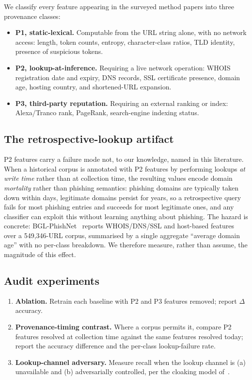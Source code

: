 \documentclass[conference]{IEEEtran}
\begin{document}
We classify every feature appearing in the surveyed method papers into three
provenance classes:

\begin{itemize}
\item \textbf{P1, static-lexical.} Computable from the URL string alone, with no
      network access: length, token counts, entropy, character-class ratios,
      TLD identity, presence of suspicious tokens.
\item \textbf{P2, lookup-at-inference.} Requiring a live network operation:
      WHOIS registration date and expiry, DNS records, SSL certificate presence,
      domain age, hosting country, and shortened-URL expansion.
\item \textbf{P3, third-party reputation.} Requiring an external ranking or
      index: Alexa/Tranco rank, PageRank, search-engine indexing status.
\end{itemize}

\subsection{The retrospective-lookup artifact}

P2 features carry a failure mode not, to our knowledge, named in this
literature. When a historical corpus is annotated with P2 features by
performing lookups \emph{at write time} rather than at collection time,
the resulting values encode domain \emph{mortality} rather than phishing
semantics: phishing domains are typically taken down within days,
legitimate domains persist for years, so a retrospective query fails for
most phishing entries and succeeds for most legitimate ones, and any
classifier can exploit this without learning anything about phishing. The
hazard is concrete: BGL-PhishNet~\cite{remya2025bgl} reports WHOIS/DNS/SSL
and host-based features over a 549{,}346-URL corpus, summarised by a
single aggregate ``average domain age'' with no per-class breakdown. We
therefore measure, rather than assume, the magnitude of this effect.

\subsection{Audit experiments}

\begin{enumerate}
\item \textbf{Ablation.} Retrain each baseline with P2 and P3 features removed;
      report $\Delta$accuracy.
\item \textbf{Provenance-timing contrast.} Where a corpus permits it, compare
      P2 features resolved at collection time against the same features resolved
      today; report the accuracy difference and the per-class lookup-failure
      rate.
\item \textbf{Lookup-channel adversary.} Measure recall when the lookup channel
      is (a) unavailable and (b) adversarially controlled, per the cloaking
      model of~\cite{li2023cloak}.
\end{enumerate}
\end{document}
